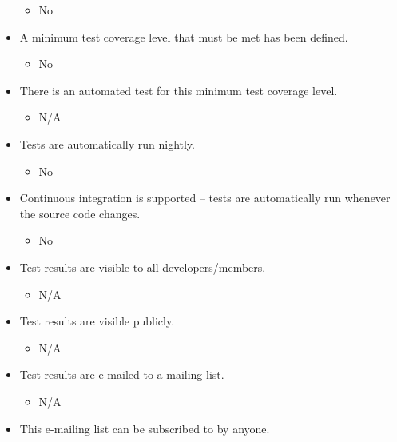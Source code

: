 \begin{itemize}
  \begin{itemize}
  \itemsep1pt\parskip0pt
  \item
    No
  \end{itemize}
\item
  A minimum test coverage level that must be met has been defined.

  \begin{itemize}
  \itemsep1pt\parskip0pt
  \item
    No
  \end{itemize}
\item
  There is an automated test for this minimum test coverage level.

  \begin{itemize}
  \itemsep1pt\parskip0pt
  \item
    N/A
  \end{itemize}
\item
  Tests are automatically run nightly.

  \begin{itemize}
  \itemsep1pt\parskip0pt
  \item
    No
  \end{itemize}
\item
  Continuous integration is supported -- tests are automatically run
  whenever the source code changes.

  \begin{itemize}
  \itemsep1pt\parskip0pt
  \item
    No
  \end{itemize}
\item
  Test results are visible to all developers/members.

  \begin{itemize}
  \itemsep1pt\parskip0pt
  \item
    N/A
  \end{itemize}
\item
  Test results are visible publicly.

  \begin{itemize}
  \itemsep1pt\parskip0pt
  \item
    N/A
  \end{itemize}
\item
  Test results are e-mailed to a mailing list.

  \begin{itemize}
  \itemsep1pt\parskip0pt
  \item
    N/A
  \end{itemize}
\item
  This e-mailing list can be subscribed to by anyone.


\end{itemize}

